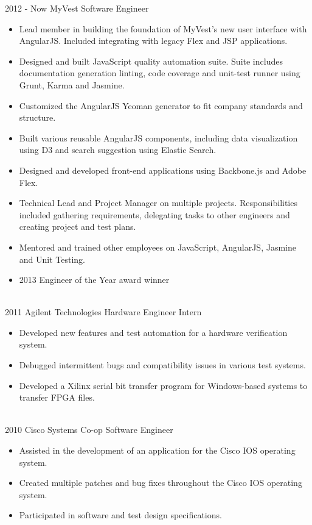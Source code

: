 \documentclass[print]{friggeri-cv}
\begin{document}
\begin{entrylist}
  \entry
    {2012 - Now}
    {MyVest}
    {Software Engineer}
    {\begin{itemize}
    \item Lead member in building the foundation of MyVest’s new user interface with AngularJS. Included integrating with legacy Flex and JSP applications.
    \item Designed and built JavaScript quality automation suite. Suite includes documentation generation linting, code coverage and unit-test runner using Grunt, Karma and Jasmine.
    \item Customized the AngularJS Yeoman generator to fit company standards and structure.
    \item Built various reusable AngularJS components, including data visualization using D3 and search suggestion using Elastic Search.
    \item Designed and developed front-end applications using Backbone.js and Adobe Flex.
    \item Technical Lead and Project Manager on multiple projects. Responsibilities included gathering requirements, delegating tasks to other engineers and creating project and test plans.
    \item Mentored and trained other employees on JavaScript, AngularJS, Jasmine and Unit Testing.
    \item 2013 Engineer of the Year award winner
    \end{itemize}
    }
  \\
  \entry
    {2011}
    {Agilent Technologies}
    {Hardware Engineer Intern}
    {\begin{itemize}
    \item Developed new features and test automation for a hardware verification system.
    \item Debugged intermittent bugs and compatibility issues in various test systems.
    \item Developed a Xilinx serial bit transfer program for Windows-based systems to transfer FPGA files.
    \end{itemize}
    }
  \\
  \entry
    {2010}
    {Cisco Systems}
    {Co-op Software Engineer}
    {\begin{itemize}
    \item Assisted in the development of an application for the Cisco IOS operating system.
    \item Created multiple patches and bug fixes throughout the Cisco IOS operating system.
    \item Participated in software and test design specifications.
    \end{itemize}
    }
\end{entrylist}
\end{document}
